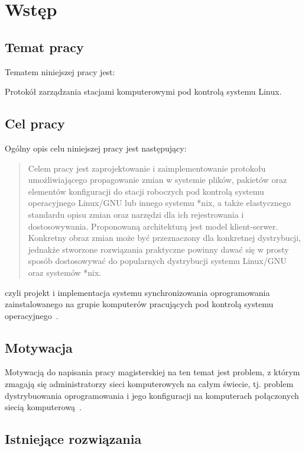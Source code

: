 \documentclass[praca_magisterska]{subfiles}
\begin{document}
\chapter{Wstęp}

\section{Temat pracy}

Tematem niniejszej pracy jest:
\begin{displayquote}
Protokół zarządzania stacjami komputerowymi pod kontrolą systemu Linux.
\end{displayquote}

\section{Cel pracy}

Ogólny opis celu niniejszej pracy jest następujący:
\blockcquote{formularz-zgloszenia-pracy}{Celem pracy jest zaprojektowanie i zaimplementowanie protokołu umożliwiającego propagowanie zmian w systemie plików, pakietów oraz elementów konfiguracji do stacji roboczych pod kontrolą systemu operacyjnego Linux/GNU lub innego systemu *nix, a także elastycznego standardu opisu zmian oraz narzędzi dla ich rejestrowania i dostosowywania. Proponowaną architekturą jest model klient-serwer. Konkretny obraz zmian może być przeznaczony dla konkretnej dystrybucji, jednakże stworzone rozwiązania praktyczne powinny dawać się w prosty sposób dostosowywać do popularnych dystrybucji systemu Linux/GNU oraz systemów *nix.}
czyli projekt i implementacja systemu synchronizowania oprogramowania zainstalowanego na grupie komputerów pracujących pod kontrolą systemu operacyjnego~\texttt{}.

\section{Motywacja}

Motywacją do napisania pracy magisterskiej na ten temat jest problem, z którym zmagają się administratorzy sieci komputerowych na całym świecie, tj. problem dystrybuowania oprogramowania i jego konfiguracji na komputerach połączonych siecią komputerową~\cite{so-problem-intro}.

\section{Istniejące rozwiązania}
\end{document}
